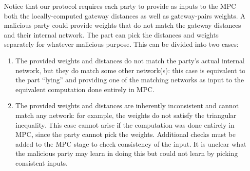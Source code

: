 Notice that our protocol requires each party to provide as inputs to the MPC both the locally-computed gateway distances as well as gateway-pairs weights. A malicious party could provide weights that do not match the gateway distances and their internal network. The part can pick the distances and weights separately for whatever malicious purpose. This can be divided into two cases:
\begin{enumerate}
\item The provided weights and distances do not match the party's actual internal network, but they do match some other network(s): this case is equivalent to the part ``lying'' and providing one of the matching networks as input to the equivalent computation done entirely in MPC.
\item The provided weights and distances are inherently inconsistent and cannot match any network: for example, the weights do not satisfy the triangular inequality. This case cannot arise if the computation was done entirely in MPC, since the party cannot pick the weights. Additional checks must be added to the MPC stage to check consistency of the input. It is unclear what the malicious party may learn in doing this but could not learn by picking consistent inputs.
\end{enumerate}


